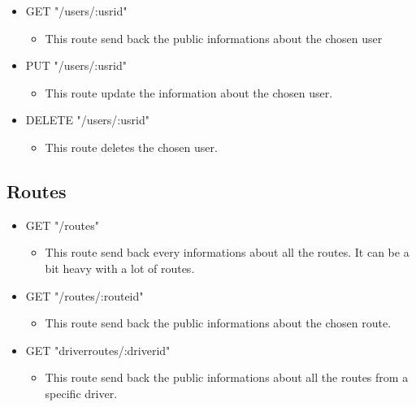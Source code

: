 \begin{itemize}
	\item GET "/users/:usrid"
	\begin{itemize}
		\item This route send back the public informations about the chosen user
	\end{itemize}
\end{itemize}


\begin{itemize}
	\item PUT "/users/:usrid"
	\begin{itemize}
		\item This route update the information about the chosen user.
	\end{itemize}
\end{itemize}


\begin{itemize}
	\item DELETE "/users/:usrid"
	\begin{itemize}
		\item This route deletes the chosen user.
	\end{itemize}
\end{itemize}

\subsection{Routes}
\begin{itemize}
	\item GET "/routes"
	\begin{itemize}
		\item This route send back every informations about all the routes. It can be a bit heavy with a lot of routes.
	\end{itemize}
\end{itemize}


\begin{itemize}
	\item GET "/routes/:routeid"
	\begin{itemize}
		\item This route send back the public informations about the chosen route.
	\end{itemize}
\end{itemize}


\begin{itemize}
	\item GET "driverroutes/:driverid"
	\begin{itemize}
		\item This route send back the public informations about all the routes from a specific driver.
	\end{itemize}
\end{itemize}

